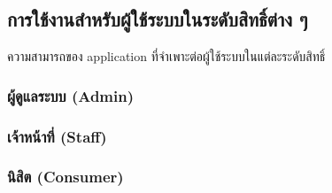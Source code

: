 \subsection{การใช้งานสำหรับผู้ใช้ระบบในระดับสิทธิ์ต่าง ๆ}
ความสามารถของ application ที่จำเพาะต่อผู้ใช้ระบบในแต่ละระดับสิทธิ์

\subsubsection{ผู้ดูแลระบบ (Admin)}
\noindent\blindtext[3]

\subsubsection{เจ้าหน้าที่ (Staff)}
\noindent\blindtext[3]

\subsubsection{นิสิต (Consumer)}
\noindent\blindtext[3]
